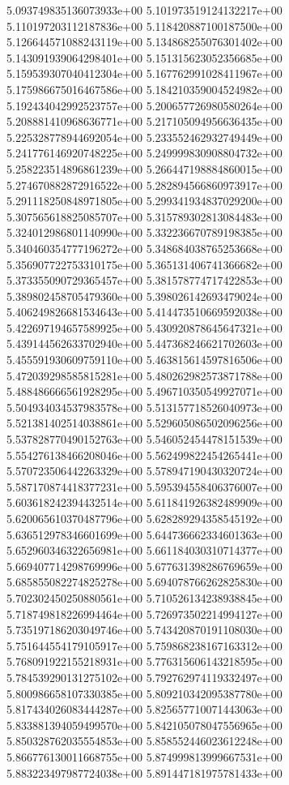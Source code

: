 5.093749835136073933e+00	5.101973519124132217e+00	5.110197203112187836e+00	5.118420887100187500e+00	5.126644571088243119e+00	5.134868255076301402e+00	5.143091939064298401e+00	5.151315623052356685e+00	5.159539307040412304e+00	5.167762991028411967e+00	5.175986675016467586e+00	5.184210359004524982e+00	5.192434042992523757e+00	5.200657726980580264e+00	5.208881410968636771e+00	5.217105094956636435e+00	5.225328778944692054e+00	5.233552462932749449e+00	5.241776146920748225e+00	5.249999830908804732e+00	5.258223514896861239e+00	5.266447198884860015e+00	5.274670882872916522e+00	5.282894566860973917e+00	5.291118250848971805e+00	5.299341934837029200e+00	5.307565618825085707e+00	5.315789302813084483e+00	5.324012986801140990e+00	5.332236670789198385e+00	5.340460354777196272e+00	5.348684038765253668e+00	5.356907722753310175e+00	5.365131406741366682e+00	5.373355090729365457e+00	5.381578774717422853e+00	5.389802458705479360e+00	5.398026142693479024e+00	5.406249826681534643e+00	5.414473510669592038e+00	5.422697194657589925e+00	5.430920878645647321e+00	5.439144562633702940e+00	5.447368246621702603e+00	5.455591930609759110e+00	5.463815614597816506e+00	5.472039298585815281e+00	5.480262982573871788e+00	5.488486666561928295e+00	5.496710350549927071e+00	5.504934034537983578e+00	5.513157718526040973e+00	5.521381402514038861e+00	5.529605086502096256e+00	5.537828770490152763e+00	5.546052454478151539e+00	5.554276138466208046e+00	5.562499822454265441e+00	5.570723506442263329e+00	5.578947190430320724e+00	5.587170874418377231e+00	5.595394558406376007e+00	5.603618242394432514e+00	5.611841926382489909e+00	5.620065610370487796e+00	5.628289294358545192e+00	5.636512978346601699e+00	5.644736662334601363e+00	5.652960346322656981e+00	5.661184030310714377e+00	5.669407714298769996e+00	5.677631398286769659e+00	5.685855082274825278e+00	5.694078766262825830e+00	5.702302450250880561e+00	5.710526134238938845e+00	5.718749818226994464e+00	5.726973502214994127e+00	5.735197186203049746e+00	5.743420870191108030e+00	5.751644554179105917e+00	5.759868238167163312e+00	5.768091922155218931e+00	5.776315606143218595e+00	5.784539290131275102e+00	5.792762974119332497e+00	5.800986658107330385e+00	5.809210342095387780e+00	5.817434026083444287e+00	5.825657710071443063e+00	5.833881394059499570e+00	5.842105078047556965e+00	5.850328762035554853e+00	5.858552446023612248e+00	5.866776130011668755e+00	5.874999813999667531e+00	5.883223497987724038e+00	5.891447181975781433e+00
